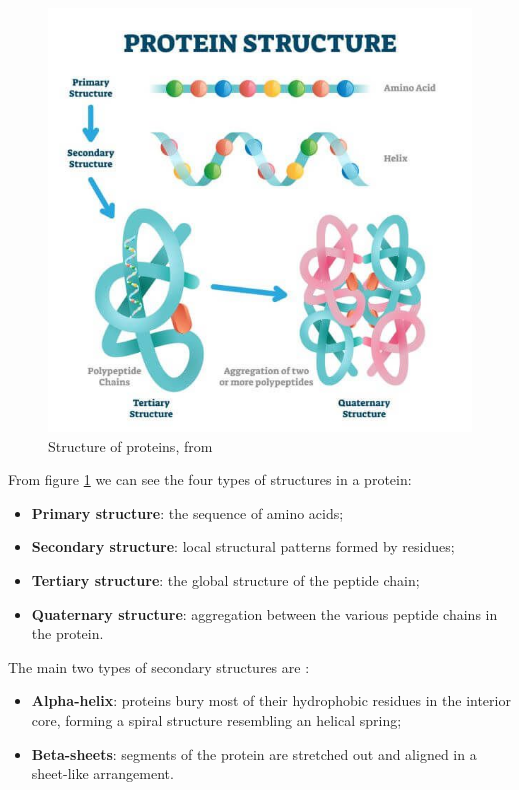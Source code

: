\begin{figure}[h!]
	\includegraphics[scale=0.75]{res/proteins_overview/protein_structure.png}
	\centering
	\caption{Structure of proteins, from \cite{structureproteins}}
	\label{fig:protein-structure}
\end{figure}

From figure \ref{fig:protein-structure} we can see the four types of structures in a protein:

\begin{itemize}
	\item \textbf{Primary structure}: the sequence of amino acids;
	\item \textbf{Secondary structure}: local structural patterns formed by residues;
	\item \textbf{Tertiary structure}: the global structure of the peptide chain;
	\item \textbf{Quaternary structure}: aggregation between the various peptide chains in the protein. 
\end{itemize}

\vspace{2em}

The main two types of secondary structures are :

\begin{itemize}
	\item \textbf{Alpha-helix}: proteins bury most of their hydrophobic residues in the interior core, forming a spiral structure resembling an helical spring;
	\item \textbf{Beta-sheets}: segments of the protein are stretched out and aligned in a sheet-like arrangement.
\end{itemize}
\vspace{6em}
\pagebreak
